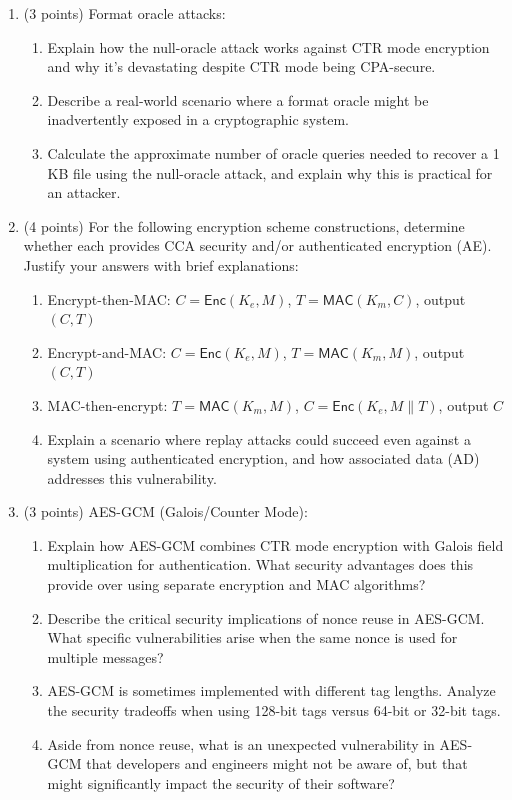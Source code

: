 \documentclass[10pt,a4paper,american]{article}
\begin{document}
\begin{enumerate}
	\item (3 points) Format oracle attacks:
	      \begin{enumerate}
		      \item Explain how the null-oracle attack works against CTR mode encryption and why it's devastating despite CTR mode being CPA-secure.
		      \item Describe a real-world scenario where a format oracle might be inadvertently exposed in a cryptographic system.
		      \item Calculate the approximate number of oracle queries needed to recover a 1 KB file using the null-oracle attack, and explain why this is practical for an attacker.
	      \end{enumerate}

	\item (4 points) For the following encryption scheme constructions, determine whether each provides CCA security and/or authenticated encryption (AE). Justify your answers with brief explanations:
	      \begin{enumerate}
		      \item Encrypt-then-MAC: $C = \textsf{Enc}(K_e, M)$, $T = \textsf{MAC}(K_m, C)$, output $(C, T)$
		      \item Encrypt-and-MAC: $C = \textsf{Enc}(K_e, M)$, $T = \textsf{MAC}(K_m, M)$, output $(C, T)$
		      \item MAC-then-encrypt: $T = \textsf{MAC}(K_m, M)$, $C = \textsf{Enc}(K_e, M\|T)$, output $C$
		      \item Explain a scenario where replay attacks could succeed even against a system using authenticated encryption, and how associated data (AD) addresses this vulnerability.
	      \end{enumerate}

	\item (3 points) AES-GCM (Galois/Counter Mode):
	      \begin{enumerate}
		      \item Explain how AES-GCM combines CTR mode encryption with Galois field multiplication for authentication. What security advantages does this provide over using separate encryption and MAC algorithms?
		      \item Describe the critical security implications of nonce reuse in AES-GCM. What specific vulnerabilities arise when the same nonce is used for multiple messages?
		      \item AES-GCM is sometimes implemented with different tag lengths. Analyze the security tradeoffs when using 128-bit tags versus 64-bit or 32-bit tags.
		      \item Aside from nonce reuse, what is an unexpected vulnerability in AES-GCM that developers and engineers might not be aware of, but that might significantly impact the security of their software?
	      \end{enumerate}
\end{enumerate}
\end{document}
